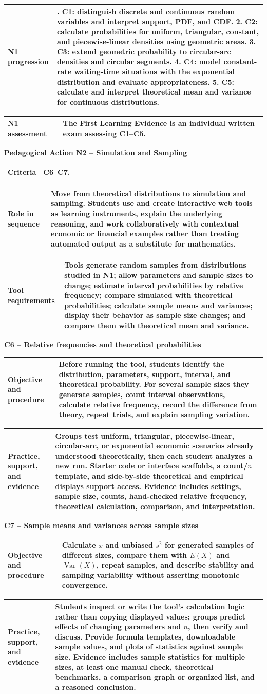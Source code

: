 \documentclass[10pt,letterpaper]{article}
\newcommand{\plansubsection}[1]{%
	\Needspace{7\baselineskip}\par\vspace{6pt}%
	\begin{tcolorbox}[
		colback=sectionblue!13,
		colframe=borderblue,
		boxrule=1.15pt,
		sharp corners,
		left=6pt,right=6pt,top=4pt,bottom=4pt,
		before skip=0pt,after skip=0pt]
		\bfseries #1
	\end{tcolorbox}%
}
\newcommand{\criterionpart}[1]{%
	\Needspace{10\baselineskip}\par\vspace{5pt}%
	\begin{tcolorbox}[
		colback=sectionblue!7,
		colframe=borderblue,
		boxrule=0.8pt,
		sharp corners,
		left=6pt,right=6pt,top=3pt,bottom=3pt,
		before skip=0pt,after skip=2pt]
		\bfseries #1
	\end{tcolorbox}%
}
\newcommand{\labelled}[2]{%
	\noindent
	\begin{tabularx}{\textwidth}{|>{\RaggedRight\arraybackslash\bfseries}p{2.12in}|>{\RaggedRight\arraybackslash}X|}
		\hline
		#1 & #2\\
		\hline
	\end{tabularx}\par\vspace{-\arrayrulewidth}%
}
\begin{document}
\labelled{N1 progression}{1. C1: distinguish discrete and continuous random variables and interpret support, PDF, and CDF. 2. C2: calculate probabilities for uniform, triangular, constant, and piecewise-linear densities using geometric areas. 3. C3: extend geometric probability to circular-arc densities and circular segments. 4. C4: model constant-rate waiting-time situations with the exponential distribution and evaluate appropriateness. 5. C5: calculate and interpret theoretical mean and variance for continuous distributions.}
\labelled{N1 assessment}{The First Learning Evidence is an individual written exam assessing C1--C5.}

\plansubsection{Pedagogical Action N2 -- Simulation and Sampling}
\labelled{Criteria}{C6--C7.}
\labelled{Role in sequence}{Move from theoretical distributions to simulation and sampling. Students use and create interactive web tools as learning instruments, explain the underlying reasoning, and work collaboratively with contextual economic or financial examples rather than treating automated output as a substitute for mathematics.}
\labelled{Tool requirements}{Tools generate random samples from distributions studied in N1; allow parameters and sample sizes to change; estimate interval probabilities by relative frequency; compare simulated with theoretical probabilities; calculate sample means and variances; display their behavior as sample size changes; and compare them with theoretical mean and variance.}

\criterionpart{C6 -- Relative frequencies and theoretical probabilities}
\labelled{Objective and procedure}{Before running the tool, students identify the distribution, parameters, support, interval, and theoretical probability. For several sample sizes they generate samples, count interval observations, calculate relative frequency, record the difference from theory, repeat trials, and explain sampling variation.}
\labelled{Practice, support, and evidence}{Groups test uniform, triangular, piecewise-linear, circular-arc, or exponential economic scenarios already understood theoretically, then each student analyzes a new run. Starter code or interface scaffolds, a count/$n$ template, and side-by-side theoretical and empirical displays support access. Evidence includes settings, sample size, counts, hand-checked relative frequency, theoretical calculation, comparison, and interpretation.}

\criterionpart{C7 -- Sample means and variances across sample sizes}
\labelled{Objective and procedure}{Calculate $\bar x$ and unbiased $s^2$ for generated samples of different sizes, compare them with $E(X)$ and $\operatorname{Var}(X)$, repeat samples, and describe stability and sampling variability without asserting monotonic convergence.}
\labelled{Practice, support, and evidence}{Students inspect or write the tool's calculation logic rather than copying displayed values; groups predict effects of changing parameters and $n$, then verify and discuss. Provide formula templates, downloadable sample values, and plots of statistics against sample size. Evidence includes sample statistics for multiple sizes, at least one manual check, theoretical benchmarks, a comparison graph or organized list, and a reasoned conclusion.}
\end{document}
